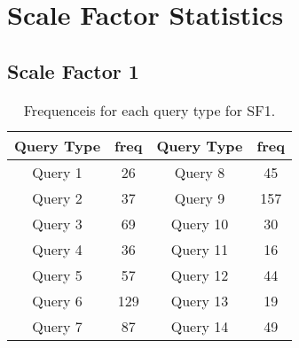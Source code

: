 \section{Scale Factor Statistics}\label{appendix:scale_factors}
\subsection{Scale Factor 1}

\begin{table}[H]
\centering
    \begin{tabular}{|c|c|c|c|}
    \hline
    Query Type & freq & Query Type & freq \\ 
    \hline
    \hline
    Query 1 & 26 & Query 8 & 45 \\ 
    \hline       
    Query 2 & 37 & Query 9 & 157 \\  
    \hline        
    Query 3 & 69 & Query 10 & 30 \\ 
    \hline        
    Query 4 & 36 & Query 11 & 16 \\ 
    \hline        
    Query 5 & 57 & Query 12 & 44 \\ 
    \hline        
    Query 6 & 129 & Query 13 & 19 \\  
    \hline        
    Query 7 & 87 & Query 14 & 49 \\ 
    \hline
    \end{tabular}
    \caption{Frequenceis for each query type for SF1.}
    \label{table:freqs_sf1}
\end{table}

